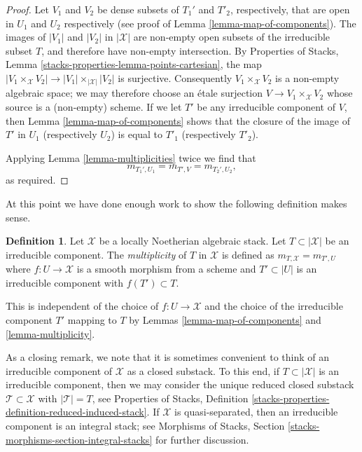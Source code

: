 \documentclass{stacks-project}
\theoremstyle{plain}
\theoremstyle{definition}
\newtheorem{definition}[subsection]{Definition}
\theoremstyle{remark}
\numberwithin{equation}{subsection}
\begin{document}
\begin{proof}
Let $V_1$ and $V_2$ be dense subsets of $T_1'$ and $T'_2$, respectively,
that are open in $U_1$ and $U_2$ respectively (see proof of
Lemma \ref{lemma-map-of-components}).
The images of $|V_1|$ and $|V_2|$ in $|\mathcal{X}|$ are non-empty open
subsets of the irreducible subset $T$, and therefore have non-empty
intersection. By
Properties of Stacks, Lemma \ref{stacks-properties-lemma-points-cartesian},
the map $|V_1 \times_\mathcal{X} V_2| \to |V_1| \times_{|\mathcal{X}|} |V_2|$
is surjective. Consequently $V_1 \times_\mathcal{X} V_2$
is a non-empty algebraic space; we may therefore choose an
\'etale surjection $V \to V_1 \times_\mathcal{X} V_2$
whose source is a (non-empty) scheme.
If we let $T'$ be any irreducible component of $V$,
then Lemma \ref{lemma-map-of-components} shows that the closure of
the image of $T'$ in $U_1$ (respectively $U_2$) is equal to $T'_1$
(respectively $T'_2$).

\medskip\noindent
Applying Lemma \ref{lemma-multiplicities} twice we find
that
$$
m_{T_1', U_1} = m_{T', V} = m_{T_2', U_2},
$$
as required.
\end{proof}

\noindent
At this point we have done enough work to show the following
definition makes sense.

\begin{definition}
\label{definition-multiplicity}
Let $\mathcal{X}$ be a locally Noetherian algebraic stack. Let
$T \subset |\mathcal{X}|$ be an irreducible component.
The {\it multiplicity} of $T$ in $\mathcal{X}$ is defined as
$m_{T, \mathcal{X}} = m_{T', U}$ where $f : U \to \mathcal{X}$
is a smooth morphism from a scheme and $T' \subset |U|$
is an irreducible component with $f(T') \subset T$.
\end{definition}

\noindent
This is independent of the choice of $f : U \to \mathcal{X}$
and the choice of the irreducible component $T'$ mapping to $T$
by Lemmas \ref{lemma-map-of-components} and \ref{lemma-multiplicity}.

\medskip\noindent
As a closing remark, we note that it is sometimes convenient to think
of an irreducible component of $\mathcal{X}$ as a closed substack.
To this end, if $T \subset |\mathcal{X}|$ is an irreducible component,
then we may consider the unique reduced closed substack
$\mathcal{T} \subset \mathcal{X}$ with $|\mathcal{T}| = T$, see
Properties of Stacks, Definition
\ref{stacks-properties-definition-reduced-induced-stack}.
If $\mathcal{X}$ is quasi-separated, then
an irreducible component is an integral stack; see
Morphisms of Stacks, Section \ref{stacks-morphisms-section-integral-stacks}
for further discussion.
\end{document}
